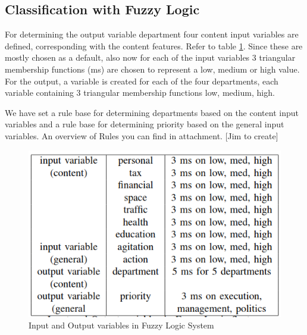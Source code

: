\documentclass[journal]{IEEEtran}
\begin{document}
\subsection{Classification with Fuzzy Logic}

For determining the output variable department four content input variables are defined, corresponding with the content features. Refer to table \ref{table:1}. Since these are mostly chosen as a default, also now for each of the input variables 3 triangular membership functions (ms) are chosen to represent a low, medium or high value. For the output, a variable is created for each of the four departments, each variable containing 3 triangular membership functions low, medium, high.

We have set a rule base for determining departments based on the content input variables and a rule base for determining priority based on the general input variables. An overview of Rules you can find in attachment. [Jim to create] \\

\begin{figure}
	\includegraphics[scale=0.5]{res/inputs_outputs_FLS.png}
	\caption{Input and Output variables in Fuzzy Logic System}
	\label{table:1}
\end{figure}
\end{document}
